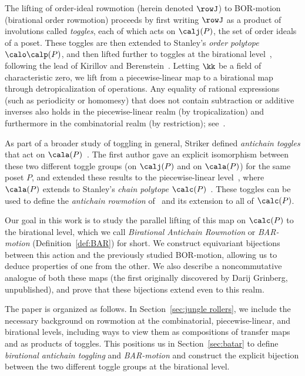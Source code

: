 The lifting of order-ideal rowmotion (herein denoted $\rowJ$) to BOR-motion (birational order rowmotion) proceeds by first writing $\rowJ$ as a product of
involutions called \textit{toggles}, each of which acts on $\calj(P)$, the set of order ideals of a
poset. These toggles are then extended to Stanley's \textit{order polytope} $\calo\calp(P)$,
and then lifted further to toggles at
the birational level~\cite{einpropp}, following the lead of Kirillov and Berenstein~\cite{berenstein}.
Letting $\kk$ be a field of characteristic zero, we lift from a piecewise-linear map to a birational map through detropicalization of operations.
Any equality of rational expressions (such as periodicity or
homomesy) that does not contain subtraction or
additive inverses 
also holds in the piecewise-linear realm (by tropicalization) and furthermore in the
combinatorial realm (by restriction); see~\cite[Remark~10]{GrRo16}.

As part of a broader study of toggling in general, Striker defined \emph{antichain toggles}
that act on $\cala (P)$~\cite{strikergentog}. The first
author gave an explicit isomorphism between these two different toggle groups (on $\calj (P)$
and on $\cala(P)$) for the same
poset $P$, and extended these results to the piecewise-linear level~\cite{antichain-toggling}, 
where $\cala (P)$
extends to Stanley's \emph{chain polytope} $\calc (P)$~\cite{Sta86}. These toggles can be
used to define the \emph{antichain rowmotion} of~\cite{brouwer1974period} and its extension
to all of $\calc (P)$.

Our goal in this work is to study the parallel lifting of this map on $\calc (P)$ to the
birational level, which we call \emph{Birational Antichain Rowmotion} or \emph{BAR-motion}
(Definition~\ref{def:BAR}) for short. We construct equivariant bijections between this
action and the previously studied BOR-motion, allowing us to deduce properties of one from
the other. We also describe a noncommutative analogue of both these maps (the first
originally discovered by Darij Grinberg, unpublished), and prove that these bijections
extend even to this realm.

The paper is organized as follows. In Section~\ref{sec:jungle rollers}, we include the
necessary background on rowmotion at the combinatorial, piecewise-linear, and birational
levels, including ways to view them as compositions of transfer maps and as products of
toggles. This positions us in Section~\ref{sec:batar} to define \textit{birational
antichain toggling} and \textit{BAR-motion} and construct the explicit bijection between the
two different toggle groups at the birational level. 

